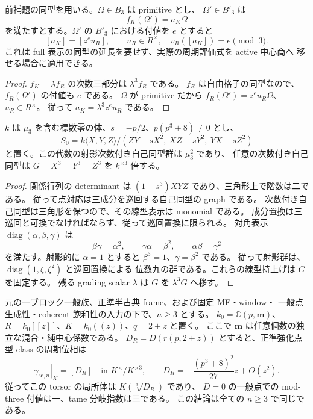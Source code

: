 \begin{lemma}
\label{lem:nfm-boundary-active-lattice-valuation}
前補題の同型を用いる。$\Omega\in B_3$ は primitive とし、
$\Omega'\in B'_3$ は
\[
 f_K(\Omega')=a_K\Omega
\]
を満たすとする。$\Omega'$ の $B'_3$ における付値を $e$ とすると
\[
 [a_K]=[z^e u_R],\qquad u_R\in R^\times,
 \quad v_R([a_K])=e\pmod3.
\]
これは full 表示の同型の延長を要せず、実際の周期評価式を active 中心商へ
移せる場合に適用できる。
\end{lemma}
\begin{proof}
$f_K=\lambda f_R$ の次数三部分は $\lambda^3 f_R$ である。
$f_R$ は自由格子の同型なので、$f_R(\Omega')$ の付値も $e$ である。
$\Omega$ が primitive だから $f_R(\Omega')=z^e u_R\Omega$、$u_R\in R^\times$。
従って $a_K=\lambda^3z^e u_R$ である。
\end{proof}

\begin{lemma}
\label{lem:nfm-triangle-sklyanin-central-scalar}
$k$ は $\mu_3$ を含む標数零の体、$s=-p/2$、$p(p^3+8)\ne0$ とし、
\[
 S_0=k\langle X,Y,Z\rangle/(ZY-sX^2,\ XZ-sY^2,\ YX-sZ^2)
\]
と置く。この代数の射影次数付き自己同型群は $\mu_3^2$ であり、
任意の次数付き自己同型は $G=X^3=Y^3=Z^3$ を $k^{\times3}$ 倍する。
\end{lemma}
\begin{proof}
関係行列の determinant は $(1-s^3)XYZ$ であり、三角形上で階数は二である。
従って点対応は三成分を巡回する自己同型の graph である。
次数付き自己同型は三角形を保つので、その線型表示は monomial である。
成分置換は三巡回と可換でなければならず、従って巡回置換に限られる。
対角表示 $\operatorname{diag}(\alpha,\beta,\gamma)$ は
\[
 \beta\gamma=\alpha^2,\qquad
 \gamma\alpha=\beta^2,\qquad
 \alpha\beta=\gamma^2
\]
を満たす。射影的に $\alpha=1$ とすると $\beta^3=1$、$\gamma=\beta^2$ である。
従って射影群は、$\operatorname{diag}(1,\zeta,\zeta^2)$ と巡回置換による
位数九の群である。これらの線型持上げは $G$ を固定する。
残る grading scalar $\lambda$ は $G$ を $\lambda^3G$ へ移す。
\end{proof}

\begin{proposition}[全次元の完備局所周期位相]
\label{prop:nfm-boundary-period-local-kummer}
元の一ブロック一般族、正準半古典 frame、および固定 MF・window・
一般点生成性・coherent 飽和性の入力の下で、$n\ge3$ とする。
$k_0=\mathbb C(p,\mathbf m)$、$R=k_0[[z]]$、$K=k_0((z))$、$q=2+z$ と置く。
ここで $\mathbf m$ は任意個数の独立な混合・純中心係数である。
$D_R=D(r(p,2+z))$ とすると、正準強化点型 class の周期位相は
\begin{equation}\label{eq:nfm-boundary-period-local-kummer}
 \left.\gamma_{\mathrm{sc},n}\right|_K=[D_R]
   \quad\text{in }K^\times/K^{\times3},\qquad
 D_R=-\frac{(p^3+8)^2}{27}z+O(z^2).
\end{equation}
従ってこの torsor の局所体は $K(\sqrt[3]{D_R})$ であり、
$D=0$ の一般点での mod-three 付値は一、tame 分岐指数は三である。
この結論は全ての $n\ge3$ で同じである。
\end{proposition}

